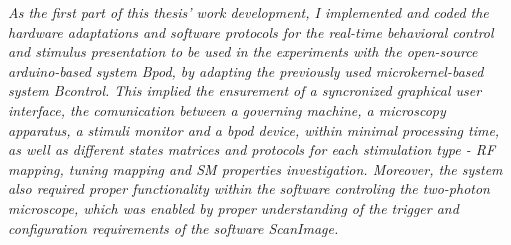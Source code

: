 
\label{cap:chapter}

\textit{As the first part of this thesis' work development, I implemented and coded the hardware adaptations and software protocols for the real-time behavioral control and stimulus presentation to be used in the experiments with the open-source arduino-based system Bpod, by adapting the previously used microkernel-based system Bcontrol. This implied the ensurement of a syncronized graphical user interface, the comunication between a governing machine, a microscopy apparatus, a stimuli monitor and a bpod device, within minimal processing time, as well as different states matrices and protocols for each stimulation type - RF mapping, tuning mapping and SM properties investigation.
Moreover, the system also required proper functionality within the software controling the two-photon microscope, which was enabled by proper understanding of the trigger and configuration requirements of the software ScanImage.}







\cleardoublepage
